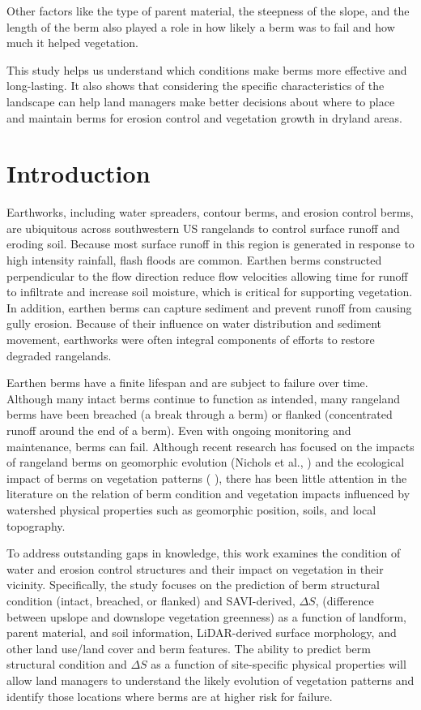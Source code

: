 \documentclass[review]{elsarticle}
\begin{document}
Other factors like the type of parent material, the steepness of the slope, and the length of the berm also played a role in how likely a berm was to fail and how much it helped vegetation. 

This study helps us understand which conditions make berms more effective and long-lasting. It also shows that considering the specific characteristics of the landscape can help land managers make better decisions about where to place and maintain berms for erosion control and vegetation growth in dryland areas.

\section{Introduction}

Earthworks, including water spreaders, contour berms, and erosion control berms, are ubiquitous across southwestern US rangelands to control surface runoff and eroding soil. Because most surface runoff in this region is generated in response to high intensity rainfall, flash floods are common. Earthen berms constructed perpendicular to the flow direction reduce flow velocities allowing time for runoff to infiltrate and increase soil moisture, which is critical for supporting vegetation. In addition, earthen berms can capture sediment and prevent runoff from causing gully erosion. Because of their influence on water distribution and sediment movement, earthworks were often integral components of efforts to restore degraded rangelands.

Earthen berms have a finite lifespan and are subject to failure over time. Although many intact berms continue to function as intended, many rangeland berms have been breached (a break through a berm) or flanked (concentrated runoff around the end of a berm). Even with ongoing monitoring and maintenance, berms can fail. Although recent research has focused on the impacts of rangeland berms on geomorphic evolution (Nichols et al.,     ) and the ecological impact of berms on vegetation patterns (         ), there has been little attention in the literature on the relation of berm condition and vegetation impacts influenced by watershed physical properties such as geomorphic position, soils, and local topography.

To address outstanding gaps in knowledge, this work examines the condition of water and erosion control structures and their impact on vegetation in their vicinity. Specifically, the study focuses on the prediction of berm structural condition (intact, breached, or flanked) and SAVI-derived, $\Delta S$, (difference between upslope and downslope vegetation greenness) as a function of landform, parent material, and soil information, LiDAR-derived surface morphology, and other land use/land cover and berm features. The ability to predict berm structural condition and $\Delta S$ as a function of site-specific physical properties will allow land managers to understand the likely evolution of vegetation patterns and identify those locations where berms are at higher risk for failure. 
\end{document}
